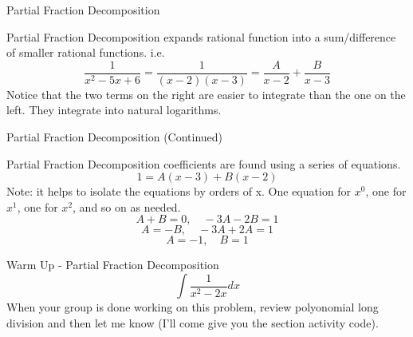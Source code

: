 \documentclass{beamer}
\begin{document}
\begin{frame}{Partial Fraction Decomposition}

Partial Fraction Decomposition expands rational function into a sum/difference of smaller rational functions. i.e. 
\[
    \frac{1}{x^2 - 5x + 6} = \frac{1}{(x-2)(x-3)} = \frac{A}{x-2} + \frac{B}{x-3}
\]
Notice that the two terms on the right are easier to integrate than the one on the left. They integrate into natural logarithms.

\end{frame}
\begin{frame}{Partial Fraction Decomposition (Continued)}

Partial Fraction Decomposition coefficients are found using a series of equations. 
\[
    1 = A(x - 3) + B(x - 2)
\]
Note: it helps to isolate the equations by orders of x. One equation for $x^0$, one for $x^1$, one for $x^2$, and so on as needed. 
\[
    A + B = 0, \quad -3A - 2B = 1
\]
\[
    A = -B, \quad -3A + 2A = 1
\]
\[
    A = -1, \quad B = 1
\]
\end{frame}

\begin{frame}{Warm Up - Partial Fraction Decomposition}
    \Large
    \[
        \int \frac{1}{x^2 - 2x}dx
    \] 
    \normalsize
    When your group is done working on this problem, review polyonomial long division and then let me know (I'll come give you the section activity code). 

\end{frame}
\end{document}
